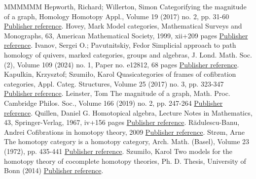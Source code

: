 \begin{thebibliography}{MMMMMM}
 Hepworth, Richard; Willerton, Simon Categorifying the magnitude of a graph, Homology Homotopy Appl., Volume 19 (2017) no. 2, pp. 31-60 \href{https://alco.centre-mersenne.org/articles/10.5802/alco.341/#hepworth-willerton}{Publisher reference}.
 Hovey, Mark Model categories, Mathematical Surveys and Monographs, 63, American Mathematical Society, 1999, xii+209 pages \href{https://alco.centre-mersenne.org/articles/10.5802/alco.341/#hovey:book}{Publisher reference}.
 Ivanov, Sergei O.; Pavutnitskiy, Fedor Simplicial approach to path homology of quivers, marked categories, groups and algebras, J. Lond. Math. Soc. (2), Volume 109 (2024) no. 1, Paper no. e12812, 68 pages \href{https://alco.centre-mersenne.org/articles/10.5802/alco.341/#ivanov-pavutniskiy}{Publisher reference}.
 Kapulkin, Krzysztof; Szumiło, Karol Quasicategories of frames of cofibration categories, Appl. Categ. Structures, Volume 25 (2017) no. 3, pp. 323-347 \href{https://alco.centre-mersenne.org/articles/10.5802/alco.341/#kapulkin-szumilo}{Publisher reference}.
 Leinster, Tom The magnitude of a graph, Math. Proc. Cambridge Philos. Soc., Volume 166 (2019) no. 2, pp. 247-264 \href{https://alco.centre-mersenne.org/articles/10.5802/alco.341/#leinster:magnitude-graph}{Publisher reference}.
 Quillen, Daniel G. Homotopical algebra, Lecture Notes in Mathematics, 43, Springer-Verlag, 1967, iv+156 pages \href{https://alco.centre-mersenne.org/articles/10.5802/alco.341/#quillen:book}{Publisher reference}.
 Rădulescu-Banu, Andrei Cofibrations in homotopy theory, 2009 \href{https://alco.centre-mersenne.org/articles/10.5802/alco.341/#radulescu-banu}{Publisher reference}.
 Strøm, Arne The homotopy category is a homotopy category, Arch. Math. (Basel), Volume 23 (1972), pp. 435-441 \href{https://alco.centre-mersenne.org/articles/10.5802/alco.341/#strom}{Publisher reference}.
 Szumiło, Karol Two models for the homotopy theory of cocomplete homotopy theories, Ph. D. Thesis, University of Bonn (2014) \href{https://alco.centre-mersenne.org/articles/10.5802/alco.341/#szumilo:two-models}{Publisher reference}.
\end{thebibliography}
